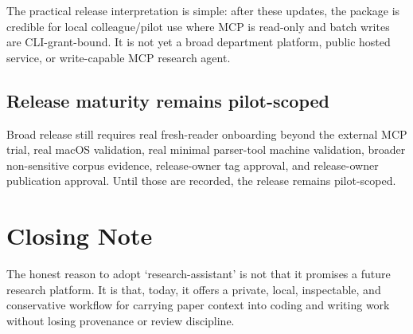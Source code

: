 \documentclass[11pt,a4paper,openany]{book}
\begin{document}
The practical release interpretation is simple: after these updates, the package
is credible for local colleague/pilot use where MCP is read-only and batch writes
are CLI-grant-bound. It is not yet a broad department platform, public hosted
service, or write-capable MCP research agent.

\section{Release maturity remains pilot-scoped}

Broad release still requires real fresh-reader onboarding beyond the external MCP
trial, real macOS validation, real minimal parser-tool machine validation,
broader non-sensitive corpus evidence, release-owner tag approval, and
release-owner publication approval. Until those are recorded, the release remains
pilot-scoped.

\backmatter
\chapter{Closing Note}

The honest reason to adopt `research-assistant' is not that it promises a future
research platform. It is that, today, it offers a private, local, inspectable,
and conservative workflow for carrying paper context into coding and writing work
without losing provenance or review discipline.
\end{document}
